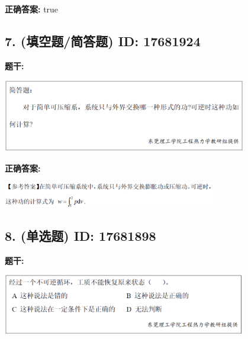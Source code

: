 \documentclass[12pt]{article}
\begin{document}
\textbf{正确答案:}
true

\vspace{0.5em}\hrulefill\vspace{1em}

\subsection*{7. (填空题/简答题) \small ID: 17681924}

\textbf{题干:}


\begin{center}\includegraphics[width=0.8\textwidth, height=0.25\textheight, keepaspectratio]{question_7_17681924/title_img_1.png}\end{center}

\textbf{正确答案:}

\begin{center}\includegraphics[width=0.7\textwidth, height=0.2\textheight, keepaspectratio]{question_7_17681924/correct_answer_1_img_1.png}\end{center}

\vspace{0.5em}\hrulefill\vspace{1em}

\subsection*{8. (单选题) \small ID: 17681898}

\textbf{题干:}


\begin{center}\includegraphics[width=0.8\textwidth, height=0.25\textheight, keepaspectratio]{question_8_17681898/title_img_1.png}\end{center}
\end{document}
